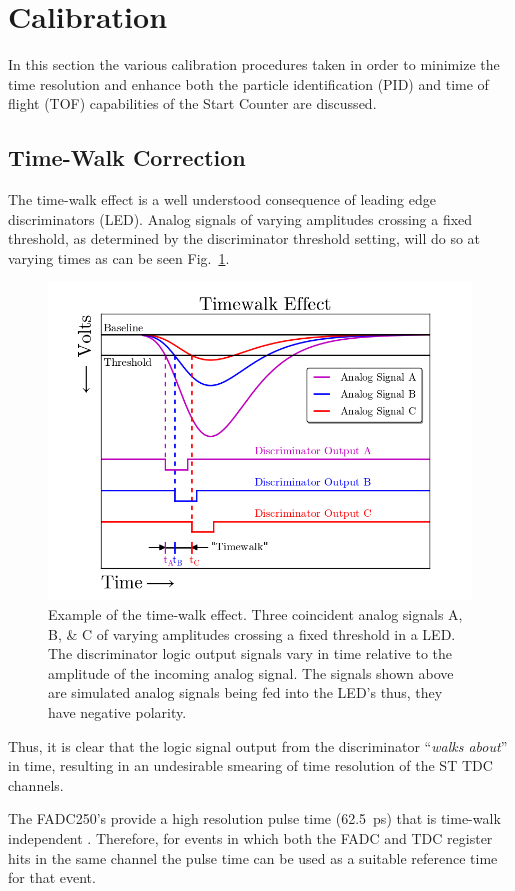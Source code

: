 \section{Calibration} \label{sec:calib}

In this section the various calibration procedures taken in order to minimize the time resolution and enhance both the particle identification (PID) and time of flight (TOF) capabilities of the Start Counter are discussed.

\subsection{Time-Walk Correction} \label{sec:calib_tw}

The time-walk effect is a well understood consequence of leading edge discriminators (LED).  Analog signals of varying amplitudes crossing a fixed threshold, as determined by the discriminator threshold setting, will do so at varying times as can be seen Fig.~\ref{fig:time_walk_effect}.
\begin{figure}[!htb]
	\centering
	\includegraphics[width=1.0\columnwidth]{calibration/figs/time_walk_effect}
	\caption{Example of the time-walk effect. Three coincident analog signals A, B, \& C of varying amplitudes crossing a fixed threshold in a LED. The discriminator logic output signals vary in time relative to the amplitude of the incoming analog signal.  The signals shown above are simulated analog signals being fed into the LED's thus, they have negative polarity.}
	\label{fig:time_walk_effect}
\end{figure}
Thus, it is clear that the logic signal output from the discriminator ``\textit{walks about}'' in time, resulting in an undesirable smearing of time resolution of the ST TDC channels.

The FADC250's provide a high resolution pulse time (62.5~ps) that is time-walk independent \cite{pooser16} \cite{dong_fadc}.  
Therefore, for events in which both the FADC and TDC register hits in the same channel the pulse time can be used as a suitable reference time for that event. 